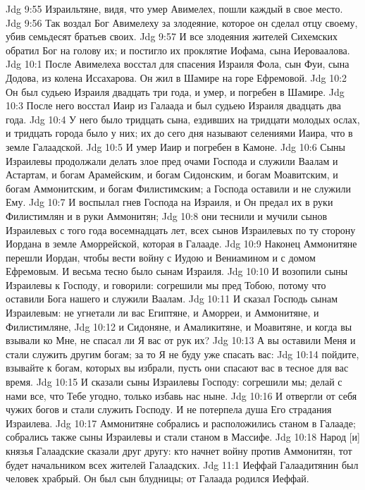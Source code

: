 Jdg 9:55  Израильтяне, видя, что умер Авимелех, пошли каждый в свое место.
Jdg 9:56  Так воздал Бог Авимелеху за злодеяние, которое он сделал отцу своему, убив семьдесят братьев своих.
Jdg 9:57  И все злодеяния жителей Сихемских обратил Бог на голову их; и постигло их проклятие Иофама, сына Иероваалова.
Jdg 10:1  После Авимелеха восстал для спасения Израиля Фола, сын Фуи, сына Додова, из колена Иссахарова. Он жил в Шамире на горе Ефремовой.
Jdg 10:2  Он был судьею Израиля двадцать три года, и умер, и погребен в Шамире.
Jdg 10:3  После него восстал Иаир из Галаада и был судьею Израиля двадцать два года.
Jdg 10:4  У него было тридцать сына, ездивших на тридцати молодых ослах, и тридцать города было у них; их до сего дня называют селениями Иаира, что в земле Галаадской.
Jdg 10:5  И умер Иаир и погребен в Камоне.
Jdg 10:6  Сыны Израилевы продолжали делать злое пред очами Господа и служили Ваалам и Астартам, и богам Арамейским, и богам Сидонским, и богам Моавитским, и богам Аммонитским, и богам Филистимским; а Господа оставили и не служили Ему.
Jdg 10:7  И воспылал гнев Господа на Израиля, и Он предал их в руки Филистимлян и в руки Аммонитян;
Jdg 10:8  они теснили и мучили сынов Израилевых с того года восемнадцать лет, всех сынов Израилевых по ту сторону Иордана в земле Аморрейской, которая в Галааде.
Jdg 10:9  Наконец Аммонитяне перешли Иордан, чтобы вести войну с Иудою и Вениамином и с домом Ефремовым. И весьма тесно было сынам Израиля.
Jdg 10:10  И возопили сыны Израилевы к Господу, и говорили: согрешили мы пред Тобою, потому что оставили Бога нашего и служили Ваалам.
Jdg 10:11  И сказал Господь сынам Израилевым: не угнетали ли вас Египтяне, и Аморреи, и Аммонитяне, и Филистимляне,
Jdg 10:12  и Сидоняне, и Амаликитяне, и Моавитяне, и когда вы взывали ко Мне, не спасал ли Я вас от рук их?
Jdg 10:13  А вы оставили Меня и стали служить другим богам; за то Я не буду уже спасать вас:
Jdg 10:14  пойдите, взывайте к богам, которых вы избрали, пусть они спасают вас в тесное для вас время.
Jdg 10:15  И сказали сыны Израилевы Господу: согрешили мы; делай с нами все, что Тебе угодно, только избавь нас ныне.
Jdg 10:16  И отвергли от себя чужих богов и стали служить Господу. И не потерпела душа Его страдания Израилева.
Jdg 10:17  Аммонитяне собрались и расположились станом в Галааде; собрались также сыны Израилевы и стали станом в Массифе.
Jdg 10:18  Народ [и] князья Галаадские сказали друг другу: кто начнет войну против Аммонитян, тот будет начальником всех жителей Галаадских.
Jdg 11:1  Иеффай Галаадитянин был человек храбрый. Он был сын блудницы; от Галаада родился Иеффай.
